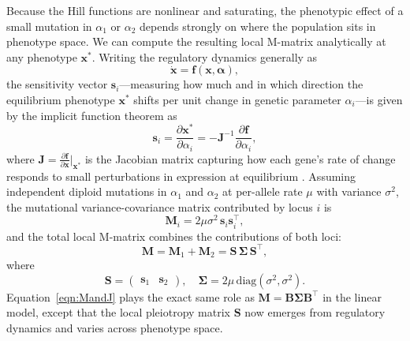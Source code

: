Because the Hill functions are nonlinear and saturating, the phenotypic effect of a small mutation in $\alpha_1$ or $\alpha_2$ depends strongly on where the population sits in phenotype space.
We can compute the resulting local M-matrix analytically at any phenotype $\mathbf{x}^*$.
Writing the regulatory dynamics generally as
\begin{equation}
\dot{\mathbf{x}} = \mathbf{f}(\mathbf{x}, \boldsymbol{\alpha}),
\end{equation}
the sensitivity vector $\mathbf{s}_i$—measuring how much and in which direction the equilibrium phenotype $\mathbf{x}^*$ shifts per unit change in genetic parameter $\alpha_i$—is given by the implicit function theorem as
\begin{equation}
\mathbf{s}_i = \frac{\partial \mathbf{x}^*}{\partial \alpha_i} = - \mathbf{J}^{-1} \frac{\partial \mathbf{f}}{\partial \alpha_i},
\end{equation}
where $\mathbf{J} = \frac{\partial \mathbf{f}}{\partial \mathbf{x}} \big|_{\mathbf{x}^*}$ is the Jacobian matrix capturing how each gene's rate of change responds to small perturbations in expression at equilibrium \parencite{khalil2002nonlinear, milocco2024utilizing, milocco2026bridging}.
Assuming independent diploid mutations in $\alpha_1$ and $\alpha_2$ at per-allele rate $\mu$ with variance $\sigma^2$, the mutational variance-covariance matrix contributed by locus $i$ is
\begin{equation}
\mathbf{M}_i = 2\mu\sigma^2 \, \mathbf{s}_i \mathbf{s}_i^\top,
\end{equation}
and the total local M-matrix combines the contributions of both loci:
\begin{equation}
\label{eqn:MandJ}
\mathbf{M} = \mathbf{M}_1 + \mathbf{M}_2 = \mathbf{S} \, \boldsymbol{\Sigma} \, \mathbf{S}^\top,
\end{equation}
where
\begin{equation}
\mathbf{S} = \begin{pmatrix} \mathbf{s}_1 & \mathbf{s}_2 \end{pmatrix},
\quad
\boldsymbol{\Sigma} = 2\mu\,\mathrm{diag}(\sigma^2, \sigma^2).
\end{equation}
Equation~\ref{eqn:MandJ} plays the exact same role as $\mathbf{M} = \mathbf{B}\boldsymbol{\Sigma}\mathbf{B}^\top$ in the linear model, except that the local pleiotropy matrix $\mathbf{S}$ now emerges from regulatory dynamics and varies across phenotype space.

